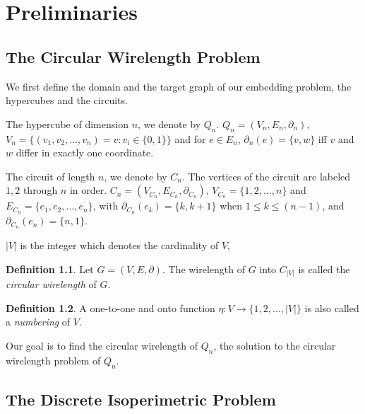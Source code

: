 \documentclass[12pt]{ucthesis}
\theoremstyle{plain}
\theoremstyle{definition}
\newtheorem{definition}{Definition}
\begin{document}
\chapter{Preliminaries}
\label{Chapter 2}

\section{The Circular Wirelength Problem}
\label{Section 2.1}

We first define the domain and the target graph of our embedding problem,
the hypercubes and the circuits.

The hypercube of dimension $n$, we denote by $Q_n$.
$Q_n = (V_n, E_n, \partial_n)$,
$V_n = \{(v_1, v_2, \dots, v_n) = v \colon v_i \in \{0, 1\}\}$ and for $e \in E_n$,
$\partial_n(e) = \{v, w\}$ iff $v$ and $w$ differ in exactly one coordinate.

The circuit of length $n$, we denote by $C_n$.
The vertices of the circuit are labeled $1, 2$ through $n$ in order.
$C_n = (V_{C_n}, E_{C_n}, \partial_{C_n})$,
$V_{C_n} = \{1, 2, \dots, n\}$ and $E_{C_n} = \{e_1, e_2, \dots, e_n\}$,
with $\partial_{C_n}(e_k) = \{k, k + 1\}$ when $1 \le k \le (n - 1)$,
and $\partial_{C_n}(e_n) = \{n, 1\}$.

$|V|$ is the integer which denotes the cardinality of $V$,
\begin{definition}
\label{Definition 4}
Let $G = (V, E, \partial)$.
The wirelength of $G$ into $C_{|V|}$ is called the \emph{circular wirelength} of $G$.
\end{definition}
\begin{definition}
\label{Definition 5}
A one-to-one and onto function $\eta \colon V \rightarrow \{1, 2, \dots, |V|\}$
is also called a \emph{numbering} of $V$.
\end{definition}

Our goal is to find the circular wirelength of $Q_n$,
the solution to the circular wirelength problem of $Q_n$.

\section{The Discrete Isoperimetric Problem}
\label{Section 2.2}
\end{document}
